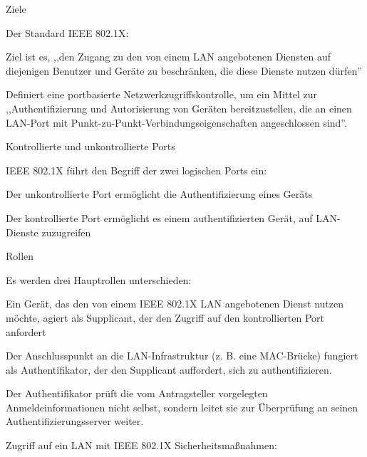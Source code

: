 \documentclass[a4paper]{article}
\begin{document}
\begin{multicols}{3}
      Ziele

      \begin{itemize*}
            \item
            Der Standard IEEE 802.1X:

            \begin{itemize*}
                  \item Ziel ist es, ,,den Zugang zu den von einem LAN angebotenen Diensten auf diejenigen Benutzer und Geräte zu beschränken, die diese Dienste nutzen dürfen''
            \end{itemize*}
            \item
            Definiert eine portbasierte Netzwerkzugriffskontrolle, um ein Mittel
            zur ,,Authentifizierung und Autorisierung von Geräten bereitzustellen,
            die an einen LAN-Port mit Punkt-zu-Punkt-Verbindungseigenschaften
            angeschlossen sind''.
      \end{itemize*}

      Kontrollierte und unkontrollierte Ports

      \begin{itemize*}
            \item
            IEEE 802.1X führt den Begriff der zwei logischen Ports ein:

            \begin{itemize*}
                  \item Der unkontrollierte Port ermöglicht die Authentifizierung eines Geräts
                  \item Der kontrollierte Port ermöglicht es einem authentifizierten Gerät, auf LAN-Dienste zuzugreifen
            \end{itemize*}
      \end{itemize*}

      Rollen

      \begin{itemize*}
            \item
            Es werden drei Hauptrollen unterschieden:

            \begin{itemize*}
                  \item Ein Gerät, das den von einem IEEE 802.1X LAN angebotenen Dienst nutzen möchte, agiert als Supplicant, der den Zugriff auf den kontrollierten Port anfordert
                  \item Der Anschlusspunkt an die LAN-Infrastruktur (z. B. eine MAC-Brücke) fungiert als Authentifikator, der den Supplicant auffordert, sich zu authentifizieren.
                  \item Der Authentifikator prüft die vom Antragsteller vorgelegten Anmeldeinformationen nicht selbst, sondern leitet sie zur Überprüfung an seinen Authentifizierungsserver weiter.
            \end{itemize*}
            \item
            Zugriff auf ein LAN mit IEEE 802.1X Sicherheitsmaßnahmen:


\end{itemize*}
\end{multicols}
\end{document}
